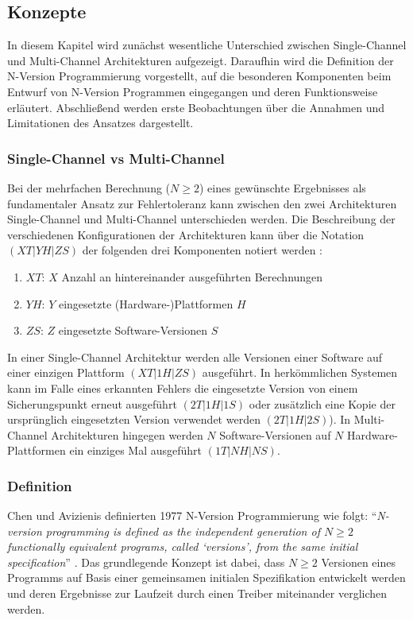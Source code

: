 \subsection{Konzepte} \label{konzepte}
%
In diesem Kapitel wird zunächst wesentliche Unterschied zwischen Single-Channel und Multi-Channel Architekturen aufgezeigt. Daraufhin wird die Definition der N-Version Programmierung vorgestellt, auf die besonderen Komponenten beim Entwurf von N-Version Programmen eingegangen und deren Funktionsweise erläutert. Abschließend werden erste Beobachtungen über die Annahmen und Limitationen des Ansatzes dargestellt.
\subsubsection{Single-Channel vs Multi-Channel} \label{channel}
%
%
Bei der mehrfachen Berechnung ($ N \geq 2 $)  eines gewünschte Ergebnisses als fundamentaler Ansatz zur Fehlertoleranz kann zwischen den zwei Architekturen Single-Channel und Multi-Channel unterschieden werden.
Die Beschreibung der verschiedenen Konfigurationen der Architekturen kann über die Notation $(XT|YH|ZS)$ der folgenden drei Komponenten notiert werden \cite{Avizienis:1985:NAF:1314034.1314064}:
\begin{enumerate}
	\item $XT$: $X$ Anzahl an hintereinander ausgeführten Berechnungen
	\item $YH$: $Y$ eingesetzte (Hardware-)Plattformen $H$
	\item $ZS$: $Z$ eingesetzte Software-Versionen $S$
\end{enumerate}
In einer Single-Channel Architektur werden alle Versionen einer Software auf einer einzigen Plattform $(XT|1H|ZS)$ ausgeführt. In herkömmlichen Systemen kann im Falle eines erkannten Fehlers die eingesetzte Version von einem Sicherungspunkt erneut ausgeführt $(2T|1H|1S)$ oder zusätzlich eine Kopie der ursprünglich eingesetzten Version verwendet werden $(2T|1H|2S)$).
In Multi-Channel Architekturen hingegen werden $N$ Software-Versionen auf $N$ Hardware-Plattformen ein einziges Mal ausgeführt $(1T|NH|NS)$. 
%
%
\subsubsection{Definition}
Chen und Avizienis definierten 1977 N-Version Programmierung wie folgt: \enquote{\emph{N-version programming is defined as the independent generation of $ N \geq 2 $ functionally equivalent programs, called \enquote{versions}, from the same initial specification}} \cite{Chen1978}.
Das grundlegende Konzept ist dabei, dass $ N \geq 2 $ Versionen eines Programms auf Basis einer gemeinsamen initialen Spezifikation entwickelt werden und deren Ergebnisse zur Laufzeit durch einen Treiber miteinander verglichen werden.
%
%
